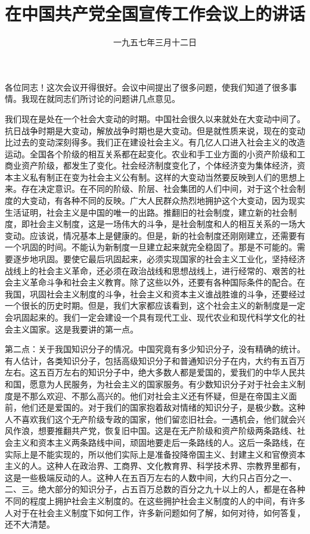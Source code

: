
\title{在中国共产党全国宣传工作会议上的讲话}
\date{一九五七年三月十二日}
\maketitle


各位同志！这次会议开得很好。会议中间提出了很多问题，使我们知道了很多事情。我现在就同志们所讨论的问题讲几点意见。

我们现在是处在一个社会大变动的时期。中国社会很久以来就处在大变动中间了。抗日战争时期是大变动，解放战争时期也是大变动。但是就性质来说，现在的变动比过去的变动深刻得多。我们正在建设社会主义。有几亿人口进入社会主义的改造运动。全国各个阶级的相互关系都在起变化。农业和手工业方面的小资产阶级和工商业资产阶级，都发生了变化。社会经济制度变化了，个体经济变为集体经济，资本主义私有制正在变为社会主义公有制。这样的大变动当然要反映到人们的思想上来。存在决定意识。在不同的阶级、阶层、社会集团的人们中间，对于这个社会制度的大变动，有各种不同的反映。广大人民群众热烈地拥护这个大变动，因为现实生活证明，社会主义是中国的唯一的出路。推翻旧的社会制度，建立新的社会制度，即社会主义制度，这是一场伟大的斗争，是社会制度和人的相互关系的一场大变动。应该说，情况基本上是健康的。但是，新的社会制度还刚刚建立，还需要有一个巩固的时间。不能认为新制度一旦建立起来就完全稳固了。那是不可能的。需要逐步地巩固。要使它最后巩固起来，必须实现国家的社会主义工业化，坚持经济战线上的社会主义革命，还必须在政治战线和思想战线上，进行经常的、艰苦的社会主义革命斗争和社会主义教育。除了这些以外，还要有各种国际条件的配合。在我国，巩固社会主义制度的斗争，社会主义和资本主义谁战胜谁的斗争，还要经过一个很长的历史时期。但是，我们大家都应该看到，这个社会主义的新制度是一定会巩固起来的。我们一定会建设一个具有现代工业、现代农业和现代科学文化的社会主义国家。这是我要讲的第一点。

第二点：关于我国知识分子的情况。中国究竟有多少知识分子，没有精确的统计。有人估计，各类知识分子，包括高级知识分子和普通知识分子在内，大约有五百万左右。这五百万左右的知识分子中，绝大多数人都是爱国的，爱我们的中华人民共和国，愿意为人民服务，为社会主义的国家服务。有少数知识分子对于社会主义制度是不那么欢迎、不那么高兴的。他们对社会主义还有怀疑，但是在帝国主义面前，他们还是爱国的。对于我们的国家抱着敌对情绪的知识分子，是极少数。这种人不喜欢我们这个无产阶级专政的国家，他们留恋旧社会。一遇机会，他们就会兴风作浪，想要推翻共产党，恢复旧中国。这是在无产阶级和资产阶级两条路线、社会主义和资本主义两条路线中间，顽固地要走后一条路线的人。这后一条路线，在实际上是不能实现的，所以他们实际上是准备投降帝国主义、封建主义和官僚资本主义的人。这种人在政治界、工商界、文化教育界、科学技术界、宗教界里都有，这是一些极端反动的人。这种人在五百万左右的人数中间，大约只占百分之一、二、三。绝大部分的知识分子，占五百万总数的百分之九十以上的人，都是在各种不同的程度上拥护社会主义制度的。在这些拥护社会主义制度的人的中间，有许多人对于在社会主义制度下如何工作，许多新问题如何了解，如何对待，如何答复，还不大清楚。

